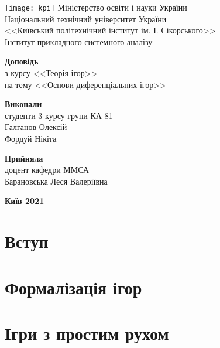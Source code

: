 \documentclass{extreport}
\begin{document}
\begin{titlepage}
    \thispagestyle{empty}
    \begin{center}
        \texttt{[image: kpi]}
        Міністерство освіти і науки України\\
        Національний технічний університет України\\
        <<Київський політехнічний інститут ім. І. Сікорського>>\\
        Інститут прикладного системного аналізу
    \end{center}
    \vspace{30mm}
    \begin{center}
        \fontsize{22}{26}\selectfont\textbf{Доповідь} \\
        з курсу <<Теорія ігор>> \\
        на тему <<Основи диференціальних ігор>>
    \end{center}
    \vspace{30mm}
    \begin{flushleft}
        \textbf{Виконали} \\ 
        студенти 3 курсу групи КА-81 \\
        Галганов Олексій \\
        Фордуй Нікіта
    \end{flushleft}
    \begin{flushright}
        \textbf{Прийняла} \\
        доцент кафедри ММСА \\
        Барановська Леся Валеріївна
    \end{flushright}
    \vspace{30mm}
    \begin{center}
        \textbf{Київ 2021}
    \end{center}
\end{titlepage}
\tableofcontents
    \chapter{Вступ}\label{ch1}
        
    \chapter{Формалізація ігор}\label{ch2}
        
    \chapter{Ігри з простим рухом}\label{ch3}
        
\end{document}
